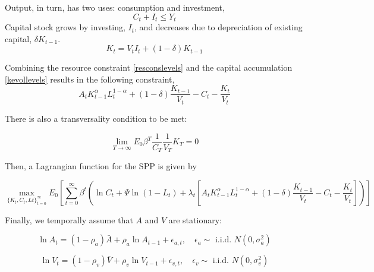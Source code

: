 \documentclass[11pt]{article}
\begin{document}
Output, in turn, has two uses: consumption and investment,
\begin{equation}\label{resconslevels}
C_t + I_t \leq Y_{t}
\end{equation}
Capital stock grows by investing, $I_t$, and decreases due to depreciation of existing capital, $\delta K_{t-1}$.
\begin{equation}\label{kevollevels}
K_{t} = V_{t} I_t + (1-\delta) K_{t-1}
\end{equation}

Combining the resource constraint \ref{resconslevels} and the capital accumulation \ref{kevollevels} results in the following constraint,
\[ A_t  K^{\alpha}_{t-1} L^{1-\alpha}_{t}  + (1-\delta) \frac{K_{t-1}}{V_t}  -C_t - \frac{K_{t}}{V_t} \]

There is also a transversality condition to be met:

\[ \lim_{T \rightarrow \infty } E_0 \beta^{T} \frac{1}{C_T} \frac{1}{V_T} K_T = 0\]


Then, a  Lagrangian function for the SPP is given by 


\begin{equation}\label{eq:LagrangianSP}
\max_{\{ K_t,C_t,Lt\}_{t=0}^{\infty}}   E_0  \left[ \sum_{t=0}^{\infty} \beta^t \left( \ln C_t + \Psi \ln (1-L_t) +\lambda_t \left[ A_t  K^{\alpha}_{t-1} L^{1-\alpha}_{t}  + (1-\delta) \frac{K_{t-1}}{V_t}  -C_t - \frac{K_{t}}{V_t}  \right]\right)  \right]  
\end{equation}

Finally, we temporally assume that $A$ and $V$ are stationary:

\begin{equation}\label{eq:evo_A}
\ln A_t = (1-\rho_a)\bar{A} + \rho_a \ln A_{t-1} + \epsilon_{a,t}, \quad \epsilon_a \sim \text{ i.i.d. } N(0,\sigma_a^2)  
\end{equation} 

\begin{equation}\label{eq:evo_V}
\ln V_t = (1-\rho_v)\bar{V} + \rho_v \ln V_{t-1} + \epsilon_{v,t}, \quad \epsilon_v \sim \text{ i.i.d. } N(0,\sigma_v^2)  
\end{equation} 
\end{document}
